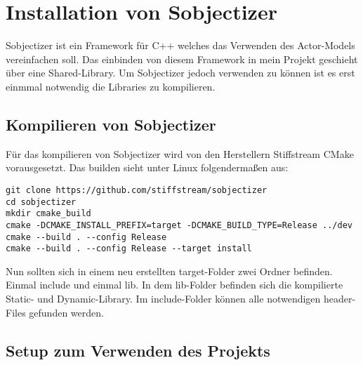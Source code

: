 \chapter{Installation von Sobjectizer}

\vspace{10mm}

Sobjectizer ist ein Framework für C++ welches das Verwenden des Actor-Models vereinfachen soll.
Das einbinden von diesem Framework in mein Projekt geschieht über eine Shared-Library.
Um Sobjectizer jedoch verwenden zu können ist es erst einmmal notwendig die Libraries zu kompilieren.

\section{Kompilieren von Sobjectizer}
Für das kompilieren von Sobjectizer wird von den Herstellern Stiffstream CMake vorausgesetzt.
Das builden sieht unter Linux folgendermaßen aus:

\begin{verbatim}
git clone https://github.com/stiffstream/sobjectizer
cd sobjectizer
mkdir cmake_build
cmake -DCMAKE_INSTALL_PREFIX=target -DCMAKE_BUILD_TYPE=Release ../dev
cmake --build . --config Release
cmake --build . --config Release --target install
\end{verbatim}

Nun sollten sich in einem neu erstellten target-Folder zwei Ordner befinden. Einmal include und einmal
lib. In dem lib-Folder befinden sich die kompilierte Static- und Dynamic-Library. Im include-Folder können
alle notwendigen header-Files gefunden werden.

\section{Setup zum Verwenden des Projekts}
